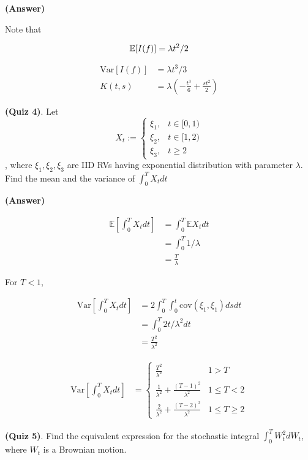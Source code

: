\documentclass[12pt]{article}
\theoremstyle{nonumberbreak}
\begin{document}
\textbf{(Answer)} 

Note that 

$$
\mathbb{E}[I(f)] = \lambda t^2 /2 \\[8pt]
$$

$$
\begin{aligned}
\mathrm{Var}[I(f)] &= \lambda t^3 /3 \\[8pt]
K(t,s) &= \lambda \left( -\frac{t^3}{6} + \frac{st^2}{2} \right)
\end{aligned}
$$




\textbf{(Quiz 4)}. Let 
$$
X_t := \begin{cases}
\xi_1, &t \in [0, 1) \\
\xi_2, &t \in [1, 2) \\
\xi_3, &t \ge 2
\end{cases}
$$, where $\xi_1, \xi_2, \xi_3$ are IID RVs having exponential distribution with parameter $\lambda$. Find the mean and the variance of $\int_0^T X_t dt$

\textbf{(Answer)} 

$$
\begin{aligned}
\mathbb{E} \left[\int_0^T X_t dt \right] &= \int_0^T \mathbb{E}X_t dt \\[8pt]
&= \int_0^T 1/\lambda \\[8pt]
&= \frac{T}{\lambda}
\end{aligned}
$$

For $T < 1$, 

$$
\begin{aligned}
\mathrm{Var} \left[\int_0^T X_t dt \right] &= 2 \int_0^T \int_0^t \mathrm{cov}(\xi_1, \xi_1)dsdt \\[8pt]
&= \int_0^T 2t/\lambda^2 dt \\[8pt]
&= \frac{T^2}{\lambda^2}
\end{aligned}
$$

$$
\begin{aligned}
\mathrm{Var}[\int_0^T X_t dt] &= \begin{cases}
\frac{T^2}{\lambda^2} & 1 > T \\
\frac{1}{\lambda^2} + \frac{(T-1)^2}{\lambda^2} & 1 \le T < 2 \\
\frac{2}{\lambda^2} + \frac{(T-2)^2}{\lambda^2} & 1 \le T \ge 2
\end{cases}
\end{aligned}
$$


\textbf{(Quiz 5)}. Find the equivalent expression for the stochastic integral $\int_0^T W_t^2 dW_t$, where $W_t$ is a Brownian motion.
\end{document}
